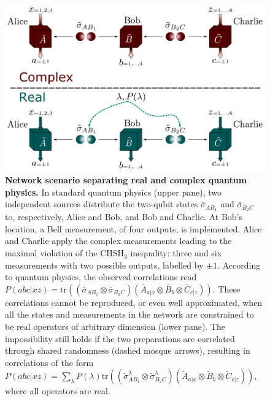 \documentclass[onecolumn,prx,amsmath,amssymb,12pt]{revtex4-2}
\def\tr{\mbox{tr}}
\begin{document}
\begin{figure}
  \centering
  \includegraphics[width=15cm]{network.pdf}
  \caption{\textbf{Network scenario separating real and complex quantum physics.} In standard quantum physics (upper pane), two independent sources distribute the two-qubit states $\bar\sigma_{AB_1}$ and $\bar\sigma_{B_2C}$ to, respectively, Alice and Bob, and Bob and Charlie. At Bob's location, a Bell measurement, of four outputs, is implemented. Alice and Charlie apply the complex measurements leading to the maximal violation of the $\text{CHSH}_3$ inequality: three and six measurements with two possible outputs, labelled by $\pm 1$. According to quantum physics, the observed correlations read $P(abc|xz)=\tr\left((\bar{\sigma}_{AB_1}\otimes\bar{\sigma}_{B_2C})(\bar{A}_{a|x}\otimes\bar{B}_{b}\otimes\bar{C}_{c|z})\right)$. These correlations cannot be reproduced, or even well approximated, when all the states and measurements in the network are constrained to be real operators of arbitrary dimension (lower pane). The impossibility still holds if the two preparations are correlated through shared randomness (dashed mosque arrows), resulting in correlations of the form $P(abc|xz)=\sum_\lambda P(\lambda)\tr\left((\tilde\sigma_{AB_1}^\lambda\otimes\tilde\sigma_{B_2C}^\lambda)(\tilde{A}_{a|x}\otimes\tilde{B}_{b}\otimes\tilde{C}_{c|z})\right)$, where all operators are real.}
  \label{fig:entswap}
\end{figure}
\end{document}
